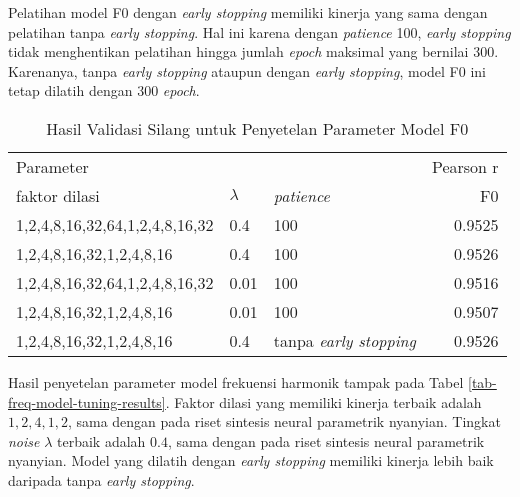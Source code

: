 Pelatihan model F0 dengan \textit{early stopping} memiliki kinerja yang sama dengan pelatihan tanpa \textit{early stopping}. Hal ini karena dengan \textit{patience} 100, \textit{early stopping} tidak menghentikan pelatihan hingga jumlah \textit{epoch} maksimal yang bernilai 300. Karenanya, tanpa \textit{early stopping} ataupun dengan \textit{early stopping}, model F0 ini tetap dilatih dengan 300 \textit{epoch}.

\begin{table}[h]
    \centering
    \caption{Hasil Validasi Silang untuk Penyetelan Parameter Model F0}\label{tab-f0-model-tuning-results}
    \begin{tabular}{ |l|l|l|r| } 
     \hline
     \multicolumn{3}{|l|}{Parameter} & Pearson r\\
     \cline{1-3}
     faktor dilasi & $\lambda$ & \textit{patience} & F0\\
     \hline 
	1,2,4,8,16,32,64,1,2,4,8,16,32 & 0.4 &100      &0.9525\\\hline
	1,2,4,8,16,32,1,2,4,8,16 & 0.4 &100            &0.9526\\\hline
	1,2,4,8,16,32,64,1,2,4,8,16,32 & 0.01 &100     &0.9516\\\hline
	1,2,4,8,16,32,1,2,4,8,16 & 0.01 &100           &0.9507\\\hline
	1,2,4,8,16,32,1,2,4,8,16 & 0.4 &tanpa \textit{early stopping}    &0.9526\\\hline
    \end{tabular}
\end{table}

Hasil penyetelan parameter model frekuensi harmonik tampak pada Tabel \ref{tab-freq-model-tuning-results}. Faktor dilasi yang memiliki kinerja terbaik adalah $1,2,4,1,2$, sama dengan pada riset sintesis neural parametrik nyanyian. Tingkat \textit{noise} $\lambda$ terbaik adalah $0.4$, sama dengan pada riset sintesis neural parametrik nyanyian. Model yang dilatih dengan \textit{early stopping} memiliki kinerja lebih baik daripada tanpa \textit{early stopping}.

